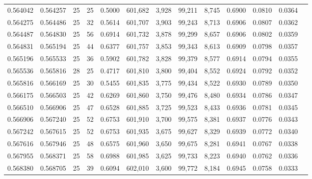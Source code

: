 \begin{tabular}{rrrrrrrrrrrrr}
0.564042 & 0.564257 &    25 &  25 &                                     0.5000 & 601,682 &   3,928 &  99,211 &   8,745 & 0.6900 & 0.0810 & 0.0364 \\
0.564275 & 0.564486 &    25 &  32 &                                     0.5614 & 601,707 &   3,903 &  99,243 &   8,713 & 0.6906 & 0.0807 & 0.0362 \\
0.564487 & 0.564830 &    25 &  56 &                                     0.6914 & 601,732 &   3,878 &  99,299 &   8,657 & 0.6906 & 0.0802 & 0.0359 \\
0.564831 & 0.565194 &    25 &  44 &                                     0.6377 & 601,757 &   3,853 &  99,343 &   8,613 & 0.6909 & 0.0798 & 0.0357 \\
0.565196 & 0.565533 &    25 &  36 &                                     0.5902 & 601,782 &   3,828 &  99,379 &   8,577 & 0.6914 & 0.0794 & 0.0355 \\
0.565536 & 0.565816 &    28 &  25 &                                     0.4717 & 601,810 &   3,800 &  99,404 &   8,552 & 0.6924 & 0.0792 & 0.0352 \\
0.565816 & 0.566169 &    25 &  30 &                                     0.5455 & 601,835 &   3,775 &  99,434 &   8,522 & 0.6930 & 0.0789 & 0.0350 \\
0.566175 & 0.566503 &    25 &  42 &                                     0.6269 & 601,860 &   3,750 &  99,476 &   8,480 & 0.6934 & 0.0786 & 0.0347 \\
0.566510 & 0.566906 &    25 &  47 &                                     0.6528 & 601,885 &   3,725 &  99,523 &   8,433 & 0.6936 & 0.0781 & 0.0345 \\
0.566906 & 0.567240 &    25 &  52 &                                     0.6753 & 601,910 &   3,700 &  99,575 &   8,381 & 0.6937 & 0.0776 & 0.0343 \\
0.567242 & 0.567615 &    25 &  52 &                                     0.6753 & 601,935 &   3,675 &  99,627 &   8,329 & 0.6939 & 0.0772 & 0.0340 \\
0.567616 & 0.567946 &    25 &  48 &                                     0.6575 & 601,960 &   3,650 &  99,675 &   8,281 & 0.6941 & 0.0767 & 0.0338 \\
0.567955 & 0.568371 &    25 &  58 &                                     0.6988 & 601,985 &   3,625 &  99,733 &   8,223 & 0.6940 & 0.0762 & 0.0336 \\
0.568380 & 0.568705 &    25 &  39 &                                     0.6094 & 602,010 &   3,600 &  99,772 &   8,184 & 0.6945 & 0.0758 & 0.0333 \\

\end{tabular}
